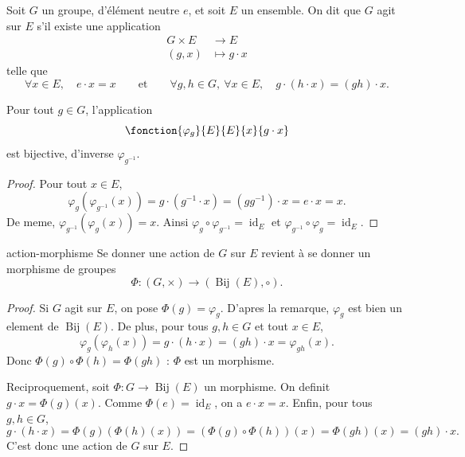 Soit $G$ un groupe, d'élément neutre $e$, et soit $E$ un ensemble.
On dit que $G$ agit sur $E$ s'il existe une application
\[
\begin{aligned}
    G \times E &\longrightarrow E \\
    (g,x) &\longmapsto g \cdot x
\end{aligned}
\]
telle que
\[
    \forall x \in E,\quad e \cdot x = x
    \qquad\text{et}\qquad
    \forall g,h \in G,\ \forall x \in E,\quad
    g \cdot (h \cdot x) = (gh) \cdot x .
\]

\begin{remarque}
    Pour tout $g \in G$, l'application
    \[
    \fonction{\varphi_g}{E}{E}{x}{g \cdot x}
    \]
    est bijective, d'inverse $\varphi_{g^{-1}}$.
\end{remarque}

\begin{proof}
    Pour tout $x \in E$,
    \[
        \varphi_g(\varphi_{g^{-1}}(x))
        = g \cdot (g^{-1} \cdot x)
        = (gg^{-1}) \cdot x
        = e \cdot x
        = x.
    \]
    De meme, $\varphi_{g^{-1}}(\varphi_g(x))=x$. Ainsi
    $\varphi_g \circ \varphi_{g^{-1}}=\operatorname{id}_E$ et
    $\varphi_{g^{-1}} \circ \varphi_g=\operatorname{id}_E$.
\end{proof}

\begin{proposition}{}{action-morphisme}
    Se donner une action de $G$ sur $E$ revient à se donner un morphisme
    de groupes
    \[
        \Phi : (G,\times) \longrightarrow (\operatorname{Bij}(E),\circ).
    \]
\end{proposition}

\begin{proof}
    Si $G$ agit sur $E$, on pose $\Phi(g)=\varphi_g$. D'apres la remarque,
    $\varphi_g$ est bien un element de $\operatorname{Bij}(E)$. De plus,
    pour tous $g,h \in G$ et tout $x \in E$,
    \[
        \varphi_g(\varphi_h(x))
        = g \cdot (h \cdot x)
        = (gh) \cdot x
        = \varphi_{gh}(x).
    \]
    Donc $\Phi(g)\circ \Phi(h)=\Phi(gh)$ : $\Phi$ est un morphisme.

    Reciproquement, soit $\Phi:G\to \operatorname{Bij}(E)$ un morphisme. On
    definit $g\cdot x=\Phi(g)(x)$. Comme $\Phi(e)=\operatorname{id}_E$, on a
    $e\cdot x=x$. Enfin, pour tous $g,h \in G$,
    \[
        g\cdot(h\cdot x)
        = \Phi(g)(\Phi(h)(x))
        = (\Phi(g)\circ\Phi(h))(x)
        = \Phi(gh)(x)
        = (gh)\cdot x.
    \]
    C'est donc une action de $G$ sur $E$.
\end{proof}


